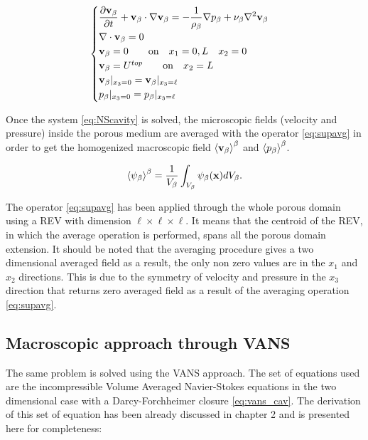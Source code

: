 
\begin{eqnarray}
\begin{cases}
\dfrac{\partial \textbf{v}_{\beta}}{\partial t} + \textbf{v}_{\beta} \cdot \nabla \textbf{v}_{\beta} = -\displaystyle\frac{1}{\rho_{\beta}} \nabla p_{\beta} + \nu_{\beta} \nabla^2  \textbf{v}_{\beta} \\
\nabla \cdot \textbf{v}_{\beta} = 0\\
\textbf{v}_{\beta} = 0 \qquad \text{on} \quad x_1 = 0,L \quad x_2 = 0 \\
\textbf{v}_{\beta} = U^{top} \qquad \text{on} \quad x_2 = L\\
\textbf{v}_{\beta}|_{x_3 = 0} = \textbf{v}_{\beta}|_{x_3 = \ell}  \\
p_{\beta}|_{x_3 = 0} = p_{\beta}|_{x_3 = \ell}
\end{cases}
\label{eq:NScavity}
\end{eqnarray}

Once the system \eqref{eq:NScavity} is solved, the microscopic fields (velocity and pressure) inside the porous medium are averaged with the operator \eqref{eq:supavg} in order to get the homogenized macroscopic field ${\left< \textbf{v}_{\beta} \right>}^{\beta}$ and ${\left< p_{\beta} \right>}^{\beta}$.

\begin{equation}
	{\left< \psi_{\beta} \right>}^{\beta} = \dfrac{1}{V_\beta} \int_{V_\beta} \psi_\beta (\mathbf{x}) d V_\beta.
	\label{eq:supavg}
\end{equation}

The operator \eqref{eq:supavg} has been applied through the whole porous domain using a REV with dimension $\ell \times \ell \times \ell$.
It means that the centroid of the REV, in which the average operation is performed, spans all the porous domain extension.
It should be noted that the averaging procedure gives a two dimensional averaged field as a result, the only non zero values are in the $x_1$ and $x_2$ directions. This is due to the symmetry of velocity and pressure in the $x_3$ direction that returns zero averaged field as a result of the averaging operation \eqref{eq:supavg}.

\subsection{Macroscopic approach through VANS}

The same problem is solved using the VANS approach.
The set of equations used are the incompressible Volume Averaged Navier-Stokes equations in the two dimensional case with a Darcy-Forchheimer closure \eqref{eq:vans_cav}.
The derivation of this set of equation has been already discussed in chapter 2 and is presented here for completeness:

